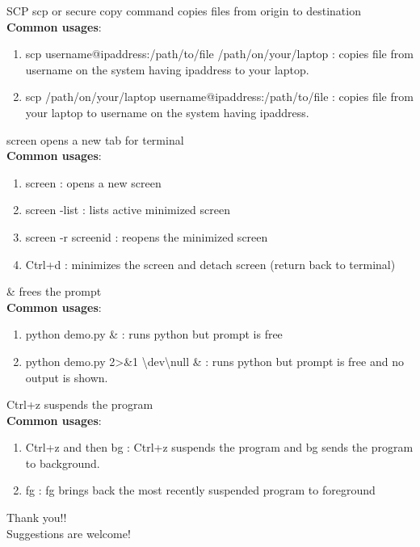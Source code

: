 \documentclass[11pt]{beamer}
\begin{document}
\begin{frame}{SCP}
scp or secure copy command copies files from origin to destination\\ \vspace{1cm}
\textbf{Common usages}:\\
\begin{enumerate}
\item scp username@ipaddress:/path/to/file /path/on/your/laptop : copies file from username on the system having ipaddress to your laptop.
\item scp /path/on/your/laptop username@ipaddress:/path/to/file : copies file from your laptop to username on the system having ipaddress.
\end{enumerate}
\end{frame}

\begin{frame}{screen}
opens a new tab for terminal\\ \vspace{1cm}
\textbf{Common usages}:\\
\begin{enumerate}
\item screen : opens a new screen

\item screen -list : lists active minimized screen
\item screen -r screenid : reopens the minimized screen
\item Ctrl+d : minimizes the screen and detach screen (return back to
terminal)
\end{enumerate}
\end{frame}

\begin{frame}{\&}
frees the prompt\\ \vspace{1cm}
\textbf{Common usages}:\\
\begin{enumerate}
\item python demo.py \& :  runs python but prompt is free
\item python demo.py 2\textgreater \&1 \textbackslash dev\textbackslash null \& : runs python but prompt is free and no output is shown.
\end{enumerate}
\end{frame}

\begin{frame}{Ctrl+z}
suspends the program\\ \vspace{1cm}
\textbf{Common usages}:\\
\begin{enumerate}
\item Ctrl+z and then bg :  Ctrl+z suspends the program and bg sends the program to background. 
\item fg : fg brings back the most recently suspended program to foreground
\end{enumerate}
\end{frame}

\begin{frame}{}
\Huge Thank you!! \\
\large Suggestions are welcome!
\end{frame}
\end{document}
